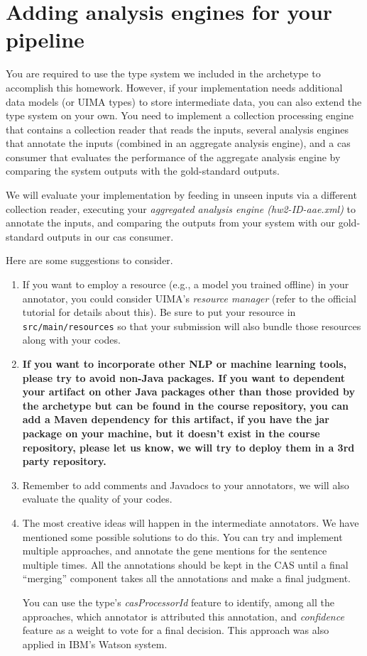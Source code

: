
\section{Adding analysis engines for your pipeline}

You are required to use the type system we included in the archetype to
accomplish this homework. However, if your implementation needs additional data
models (or UIMA types) to store intermediate data, you can also extend the type
system on your own. You need to implement a collection processing engine that
contains a collection reader that reads the inputs, several analysis engines
that annotate the inputs (combined in an aggregate analysis engine), and a cas
consumer that evaluates the performance of the aggregate analysis engine by
comparing the system outputs with the gold-standard outputs.

We will evaluate your implementation by feeding in unseen inputs via a different
collection reader, executing your \emph{aggregated analysis engine (hw2-ID-aae.xml)} to annotate
the inputs, and comparing the outputs from your system with our gold-standard
outputs in our cas consumer.

Here are some suggestions to consider.

\begin{enumerate}

\item If you want to employ a resource (e.g., a model you trained offline) in
your annotator, you could consider UIMA's \emph{resource manager} (refer to the
official tutorial for details about this).
Be sure to put your resource in \texttt{src/main/resources} so that your
submission will also bundle those resources along with your codes.

\item \textbf{If you want to incorporate other NLP or machine learning tools,
please try to avoid non-Java packages. If you want to dependent your artifact on
other Java packages other than those provided by the archetype but can be found
in the course repository, you can add a Maven dependency for this artifact, if
you have the jar package on your machine, but it doesn't exist in the course
repository, please let us know, we will try to deploy them in a 3rd party
repository.}

\item Remember to add comments and Javadocs to your annotators, we will also
evaluate the quality of your codes.

\item The most creative ideas will happen in the intermediate annotators. We
have mentioned some possible solutions to do this. You can try and implement
multiple approaches, and annotate the gene mentions for the sentence multiple
times. All the annotations should be kept in the CAS until a final ``merging''
component takes all the annotations and make a final judgment.

You can use the type's \emph{casProcessorId} feature to identify, among all the
approaches, which annotator is attributed this annotation, and \emph{confidence}
feature as a weight to vote for a final decision. This approach was also applied
in IBM's Watson system.

\end{enumerate}
